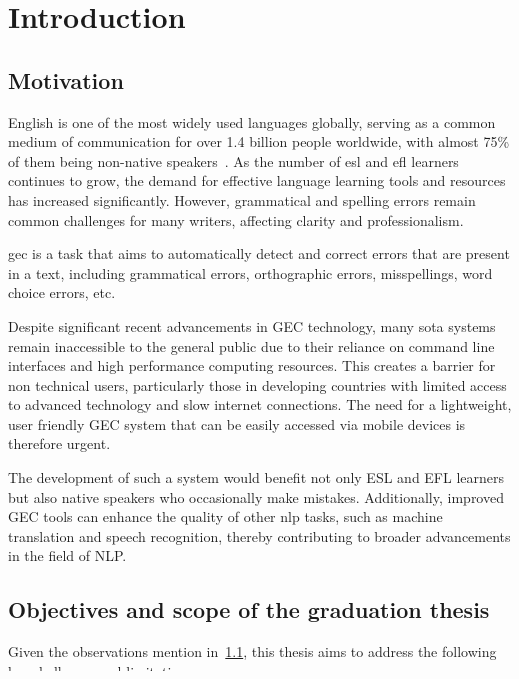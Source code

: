 \chapter{Introduction}

\section{Motivation}
\label{section:motivation}

English is one of the most widely used languages globally, serving as a common medium of communication for over 1.4 billion people worldwide, with almost 75\% of them being non-native speakers~\citep{eberhard2015ethnologue}.
As the number of \acrfull{esl} and \acrfull{efl} learners continues to grow, the demand for effective language learning tools and resources has increased significantly.
However, grammatical and spelling errors remain common challenges for many writers, affecting clarity and professionalism.

\acrfull{gec} is a task that aims to automatically detect and correct errors that are present in a text, including grammatical errors, orthographic errors, misspellings, word choice errors, etc. \citep{ng-etal-2014-conll}

Despite significant recent advancements in GEC technology, many \acrfull{sota} systems remain inaccessible to the general public due to their reliance on command line interfaces and high performance computing resources.
This creates a barrier for non technical users, particularly those in developing countries with limited access to advanced technology and slow internet connections.
The need for a lightweight, user friendly GEC system that can be easily accessed via mobile devices is therefore urgent.

The development of such a system would benefit not only ESL and EFL learners but also native speakers who occasionally make mistakes.
Additionally, improved GEC tools can enhance the quality of other \acrfull{nlp} tasks, such as machine translation and speech recognition, thereby contributing to broader advancements in the field of NLP.

\section{Objectives and scope of the graduation thesis}
\label{section:objective}
Given the observations mention in~\ref{section:motivation}, this thesis aims to address the following key challenges and limitations:

